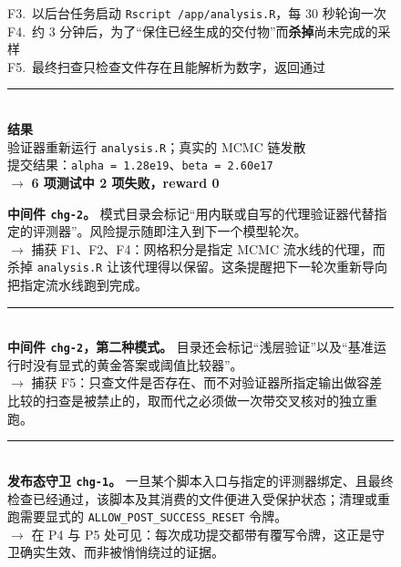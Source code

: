 \begin{figure}[t]
\begin{tcbraster}
\begin{tcolorbox}[colback=aheSky!18,colframe=aheNavy,colbacktitle=aheNavy,
                          title={\scriptsize\textbf{迭代 6 变更之前，迭代 5，reward 0.0}}]
            F3.~以后台任务启动 \texttt{Rscript /app/analysis.R}，每 30 秒轮询一次 \\[2pt]
            F4.~约 3 分钟后，为了``保住已经生成的交付物''而\textbf{杀掉}尚未完成的采样 \\[2pt]
            F5.~最终扫查只检查文件存在且能解析为数字，返回通过 \\[3pt]
            \rule{\linewidth}{0.3pt}\\
            \textbf{\textcolor{aheNavy}{结果}} \\
            验证器重新运行 \texttt{analysis.R}；真实的 MCMC 链发散 \\
            提交结果：\texttt{alpha = 1.28e19}、\texttt{beta = 2.60e17} \\
            $\rightarrow$ \textbf{6 项测试中 2 项失败，reward 0}
        \end{tcolorbox}
        \begin{tcolorbox}[colback=black!3,colframe=black!65,colbacktitle=black!75,
                          title={\scriptsize\textbf{弥合每处缺口的迭代 6 变更}}]
            \textbf{\textcolor{black!85}{中间件 \texttt{chg-2}。}} 模式目录会标记``用内联或自写的代理验证器代替指定的评测器''。风险提示随即注入到下一个模型轮次。 \\
            \textcolor{black!60}{$\rightarrow$ 捕获 F1、F2、F4：网格积分是指定 MCMC 流水线的代理，而杀掉 \texttt{analysis.R} 让该代理得以保留。这条提醒把下一轮次重新导向把指定流水线跑到完成。} \\[3pt]
            \rule{\linewidth}{0.2pt}\\[1pt]
            \textbf{\textcolor{black!85}{中间件 \texttt{chg-2}，第二种模式。}} 目录还会标记``浅层验证''以及``基准运行时没有显式的黄金答案或阈值比较器''。 \\
            \textcolor{black!60}{$\rightarrow$ 捕获 F5：只查文件是否存在、而不对验证器所指定输出做容差比较的扫查是被禁止的，取而代之必须做一次带交叉核对的独立重跑。} \\[3pt]
            \rule{\linewidth}{0.2pt}\\[1pt]
            \textbf{\textcolor{black!85}{发布态守卫 \texttt{chg-1}。}} 一旦某个脚本入口与指定的评测器绑定、且最终检查已经通过，该脚本及其消费的文件便进入受保护状态；清理或重跑需要显式的 \texttt{ALLOW\_POST\_SUCCESS\_RESET} 令牌。 \\
            \textcolor{black!60}{$\rightarrow$ 在 P4 与 P5 处可见：每次成功提交都带有覆写令牌，这正是守卫确实生效、而非被悄悄绕过的证据。}
        \end{tcolorbox}

\end{tcbraster}
\end{figure}
